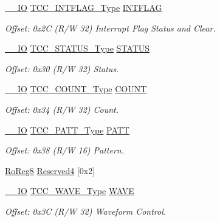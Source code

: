\begin{DoxyCompactItemize}
\mbox{\hyperlink{core__cm0plus_8h_aec43007d9998a0a0e01faede4133d6be}{\+\_\+\+\_\+\+IO}} \mbox{\hyperlink{union_t_c_c___i_n_t_f_l_a_g___type}{T\+C\+C\+\_\+\+I\+N\+T\+F\+L\+A\+G\+\_\+\+Type}} \mbox{\hyperlink{struct_tcc_ac336c2677229711cac183a8a51b2a6c9}{I\+N\+T\+F\+L\+AG}}
\begin{DoxyCompactList}\small\item\em Offset\+: 0x2C (R/W 32) Interrupt Flag Status and Clear. \end{DoxyCompactList}\item 
\mbox{\hyperlink{core__cm0plus_8h_aec43007d9998a0a0e01faede4133d6be}{\+\_\+\+\_\+\+IO}} \mbox{\hyperlink{union_t_c_c___s_t_a_t_u_s___type}{T\+C\+C\+\_\+\+S\+T\+A\+T\+U\+S\+\_\+\+Type}} \mbox{\hyperlink{struct_tcc_af6917afcdf62cd2447e23fd6233aee35}{S\+T\+A\+T\+US}}
\begin{DoxyCompactList}\small\item\em Offset\+: 0x30 (R/W 32) Status. \end{DoxyCompactList}\item 
\mbox{\hyperlink{core__cm0plus_8h_aec43007d9998a0a0e01faede4133d6be}{\+\_\+\+\_\+\+IO}} \mbox{\hyperlink{union_t_c_c___c_o_u_n_t___type}{T\+C\+C\+\_\+\+C\+O\+U\+N\+T\+\_\+\+Type}} \mbox{\hyperlink{struct_tcc_a9557ee66e5d5d14ee25936822ac5ed87}{C\+O\+U\+NT}}
\begin{DoxyCompactList}\small\item\em Offset\+: 0x34 (R/W 32) Count. \end{DoxyCompactList}\item 
\mbox{\hyperlink{core__cm0plus_8h_aec43007d9998a0a0e01faede4133d6be}{\+\_\+\+\_\+\+IO}} \mbox{\hyperlink{union_t_c_c___p_a_t_t___type}{T\+C\+C\+\_\+\+P\+A\+T\+T\+\_\+\+Type}} \mbox{\hyperlink{struct_tcc_a83f6b6d53e8159a0444875b4b8eb485d}{P\+A\+TT}}
\begin{DoxyCompactList}\small\item\em Offset\+: 0x38 (R/W 16) Pattern. \end{DoxyCompactList}\item 
\mbox{\hyperlink{group___s_a_m_d21_e15_a__definitions_ga0d957f1433aaf5d70e4dc2b68288442d}{Ro\+Reg8}} \mbox{\hyperlink{struct_tcc_afdb8a8dce919f0c98e4427301fb81799}{Reserved4}} \mbox{[}0x2\mbox{]}
\item 
\mbox{\hyperlink{core__cm0plus_8h_aec43007d9998a0a0e01faede4133d6be}{\+\_\+\+\_\+\+IO}} \mbox{\hyperlink{union_t_c_c___w_a_v_e___type}{T\+C\+C\+\_\+\+W\+A\+V\+E\+\_\+\+Type}} \mbox{\hyperlink{struct_tcc_a652764bd72a23db34e8de5af242e7d3f}{W\+A\+VE}}
\begin{DoxyCompactList}\small\item\em Offset\+: 0x3C (R/W 32) Waveform Control. \end{DoxyCompactList}\item 

\end{DoxyCompactItemize}
